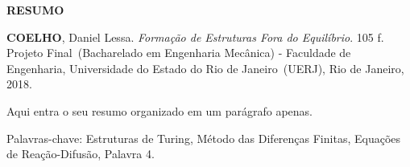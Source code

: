 \begin{center}
\textbf{RESUMO}
\end{center}

%
%

$\!$\\

\hspace{-1.3cm}\textbf{COELHO}, Daniel Lessa. \textit{Formação de Estruturas Fora do Equilíbrio}. 105 f. Projeto Final~(Bacharelado em Engenharia Mecânica) - Faculdade de Engenharia, Universidade do Estado do Rio de Janeiro~(UERJ), Rio de Janeiro, 2018.

\vspace{.2cm}

Aqui entra o seu resumo organizado em um parágrafo apenas.

\vspace{1cm}

\hspace{-1.3cm}Palavras-chave: Estruturas de Turing, Método das Diferenças Finitas, Equações de Reação-Difusão, Palavra 4.
